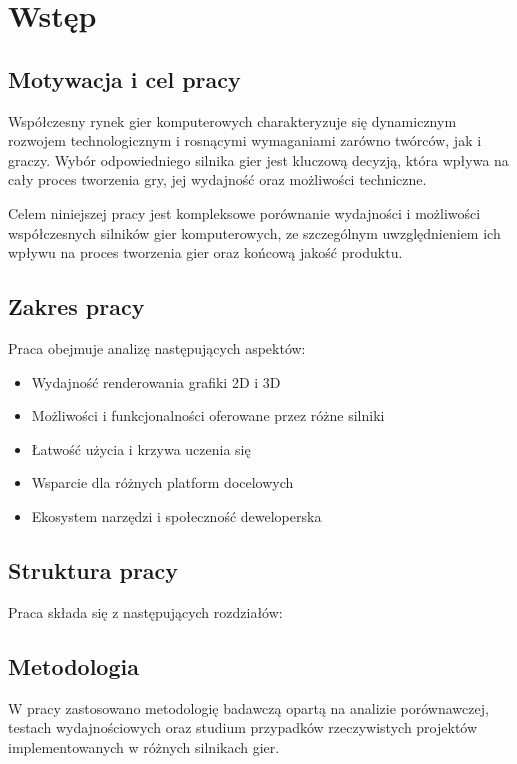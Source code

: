 \clearpage %
\section{Wstęp}

\subsection{Motywacja i cel pracy}
Współczesny rynek gier komputerowych charakteryzuje się dynamicznym rozwojem technologicznym i rosnącymi wymaganiami zarówno twórców, jak i graczy. Wybór odpowiedniego silnika gier jest kluczową decyzją, która wpływa na cały proces tworzenia gry, jej wydajność oraz możliwości techniczne.

Celem niniejszej pracy jest kompleksowe porównanie wydajności i możliwości współczesnych silników gier komputerowych, ze szczególnym uwzględnieniem ich wpływu na proces tworzenia gier oraz końcową jakość produktu.

\subsection{Zakres pracy}
Praca obejmuje analizę następujących aspektów:
\begin{itemize}
    \item Wydajność renderowania grafiki 2D i 3D
    \item Możliwości i funkcjonalności oferowane przez różne silniki
    \item Łatwość użycia i krzywa uczenia się
    \item Wsparcie dla różnych platform docelowych
    \item Ekosystem narzędzi i społeczność deweloperska
\end{itemize}

\subsection{Struktura pracy}
Praca składa się z następujących rozdziałów:

\subsection{Metodologia}
W pracy zastosowano metodologię badawczą opartą na analizie porównawczej, testach wydajnościowych oraz studium przypadków rzeczywistych projektów implementowanych w różnych silnikach gier.

